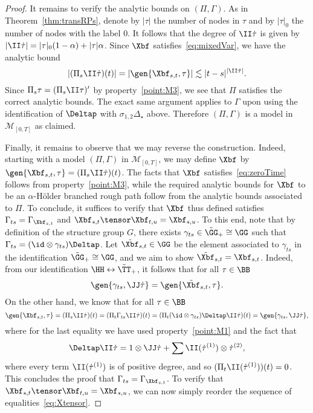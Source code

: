 \documentclass{article}
\begin{document}
\begin{proof}
It remains to verify the analytic bounds on $(\Pi,\Gamma)$. As in Theorem~\ref{thm:transRPs}, denote by $|\tau|$ the number of nodes in $\tau$ and by $|\tau|_0$ the number of nodes with the label $0$. It follows that the degree of $\II\dot\tau$ is given by $|\II\dot\tau| = |\tau|_0(1-\alpha) + |\tau|\alpha$. Since $\Xbf$ satisfies~\eqref{eq:mixedVar}, we have the analytic bound
\[
|(\Pi_s\II\dot\tau)(t)| = |\gen{\Xbf_{s,t}, \tau}| \lesssim |t-s|^{|\II\dot\tau|}.
\]
Since $\Pi_s\tau = (\Pi_s\II\tau)'$ by property~\ref{point:M3}, we see that $\Pi$ satisfies the correct analytic bounds. The exact same argument applies to $\Gamma$ upon using the identification of $\Deltap$ with $\sigma_{1,2}\Delta_\star$ above. Therefore $(\Pi,\Gamma)$ is a model in $\mathscr{M}_{[0,T]}$ as claimed.

Finally, it remains to observe that we may reverse the construction. Indeed, starting with a model $(\Pi,\Gamma)$ in $\mathscr{M}_{[0,T]}$, we may define $\Xbf$ by $\gen{\Xbf_{s,t},\tau} = (\Pi_s\II\dot\tau)(t)$. The facts that $\Xbf$ satisfies~\eqref{eq:zeroTime} follows from property~\ref{point:M3}, while the required analytic bounds for $\Xbf$ to be an $\alpha$-H{\"o}lder branched rough path follow from the analytic bounds associated to $\Pi$. To conclude, it suffices to verify that $\Xbf$ thus defined satisfies $\Gamma_{ts} = \Gamma_{\Xbf_{s,t}}$ and $\Xbf_{s,t}\tensor \Xbf_{t,u} = \Xbf_{s,u}$. To this end, note that by definition of the structure group $G$, there exists $\gamma_{ts} \in \tilde \GG_+ \cong \GG$ such that $\Gamma_{ts} = (\id \otimes \gamma_{ts})\Deltap$. Let $\tilde \Xbf_{s,t} \in \GG$ be the element associated to $\gamma_{ts}$ in the identification $\tilde \GG_+ \cong \GG$, and we aim to show $\tilde \Xbf_{s,t} = \Xbf_{s,t}$. Indeed, from our identification $\HH \leftrightarrow \tilde \TT_+$, it follows that for all $\tau \in \BB$
\[
\gen{\gamma_{ts}, \JJ\dot\tau} = \gen{\tilde \Xbf_{s,t}, \tau}.
\]
On the other hand, we know that for all $\tau \in \BB$
\[
\gen{\Xbf_{s,t},\tau} = (\Pi_s\II\dot\tau)(t) = (\Pi_t \Gamma_{ts}\II\dot \tau) (t) = (\Pi_t (\id\otimes \gamma_{ts})\Deltap\II\dot\tau)(t) = \gen{\gamma_{ts},\JJ\dot\tau},
\]
where for the last equality we have used property~\ref{point:M1} and the fact that
\[
\Deltap \II\dot\tau = 1\otimes \JJ\dot\tau + \sum \II(\dot\tau^{(1)})\otimes \dot\tau^{(2)},
\]
where every term $\II(\dot\tau^{(1)})$ is of positive degree, and so $(\Pi_t\II(\dot\tau^{(1)}))(t) = 0$. This concludes the proof that $\Gamma_{ts} = \Gamma_{\Xbf_{s,t}}$. To verify that $\Xbf_{s,t}\tensor \Xbf_{t,u} = \Xbf_{s,u}$, we can now simply reorder the sequence of equalities~\eqref{eq:Xtensor}.
\end{proof}
\end{document}
